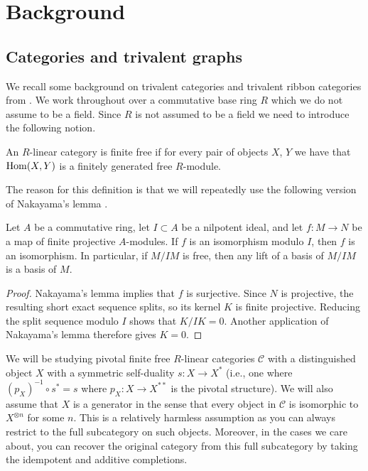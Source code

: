 \documentclass[12pt]{amsart}
\begin{document}
\section{Background} \label{sec:Background}

\subsection{Categories and trivalent graphs}

We recall some background on trivalent categories and trivalent ribbon categories from \cite{MR3624901,MR5101335}. We work throughout over a commutative base ring $R$ which we do not assume to be a field. Since $R$ is not assumed to be a field we need to introduce the following notion.

\begin{definition}
    An $R$-linear category is finite free if for every pair of objects $X$, $Y$ we have that $\operatorname{Hom}(X,Y)$ is a finitely generated free $R$-module.
\end{definition}

The reason for this definition is that we will repeatedly use the following version of Nakayama's lemma \cite[Lemma 00DV]{stacks-project}.

\begin{lemma} \label{lem:projectiveNakayama}
    Let $A$ be a commutative ring, let $I\subset A$ be a nilpotent
    ideal, and let $f\colon M\to N$ be a map of finite projective
    $A$-modules. If $f$ is an isomorphism modulo $I$, then $f$ is an
    isomorphism. In particular, if $M/IM$ is free, then any 
    lift of a basis of $M/IM$ is a basis of $M$.
\end{lemma}
\begin{proof}
    Nakayama's lemma implies that $f$ is surjective. Since $N$ is
projective, the resulting short exact sequence splits, so its kernel
$K$ is finite projective. Reducing the split sequence modulo $I$ shows
that $K/IK=0$. Another application of Nakayama's lemma therefore gives
$K=0$.
\end{proof}



We will be studying pivotal finite free $R$-linear categories $\mathcal{C}$ with a distinguished object $X$ with a symmetric self-duality $s\colon X \rightarrow X^*$ (i.e., one where $(p_X)^{-1} \circ s^* = s$ where $p_X \colon X \to X^{**}$ is the pivotal structure). We will also assume that $X$ is a generator in the sense that every object in $\mathcal{C}$ is isomorphic to $X^{\otimes n}$ for some $n$. This is a relatively harmless assumption as you can always restrict to the full subcategory on such objects. Moreover, in the cases we care about, you can recover the original category from this full subcategory by taking the idempotent and additive completions.
\end{document}
